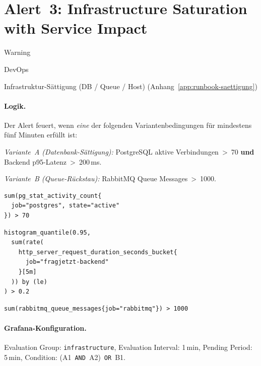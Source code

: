 \bigskip
\section{Alert~3: Infrastructure Saturation with Service Impact}

\begin{description}[style=sameline, leftmargin=5.4cm, labelwidth=4.6cm, labelsep=0.8cm]
  \item[Severity] Warning
  \item[Primäre Rolle] DevOps
  \item[Zugehöriges Runbook] Infrastruktur-Sättigung (DB / Queue / Host) (Anhang~\ref{app:runbook-saettigung})
\end{description}

\paragraph{Logik.}
Der Alert feuert, wenn \emph{eine} der folgenden Variantenbedingungen für mindestens fünf Minuten erfüllt ist:

\emph{Variante~A (Datenbank-Sättigung):} PostgreSQL aktive Verbindungen~>~70 \textbf{und} Backend p95-Latenz~>~200\,ms.

\emph{Variante~B (Queue-Rückstau):} RabbitMQ Queue Messages~>~1000.

\begin{lstlisting}[style=bashstyle, numbers=none]
sum(pg_stat_activity_count{
  job="postgres", state="active"
}) > 70
\end{lstlisting}

\begin{lstlisting}[style=bashstyle, numbers=none]
histogram_quantile(0.95,
  sum(rate(
    http_server_request_duration_seconds_bucket{
      job="fragjetzt-backend"
    }[5m]
  )) by (le)
) > 0.2
\end{lstlisting}

\begin{lstlisting}[style=bashstyle, numbers=none]
sum(rabbitmq_queue_messages{job="rabbitmq"}) > 1000
\end{lstlisting}

\paragraph{Grafana-Konfiguration.}
Evaluation Group: \texttt{infrastructure}, Evaluation Interval: 1\,min, Pending Period: 5\,min, Condition: (A1~\texttt{AND}~A2)~\texttt{OR}~B1.

